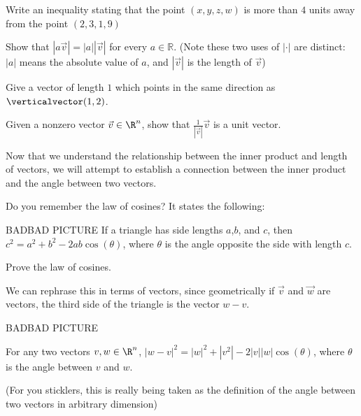 \begin{question}
	Write an inequality stating that the point $(x,y,z,w)$ is more than $4$ units away from the point $(2,3,1,9)$
\end{question}

\begin{question}
	Show that $|a\vec{v}| = |a| |\vec{v}|$ for every $a \in \mathbb{R}$. (Note these two uses of $|\cdot|$ are distinct:  $|a|$ means the absolute value of $a$, and $|\vec{v}|$ is the 
	length of $\vec{v}$)
\end{question}

\begin{question}
	Give a vector of length $1$ which points in the same direction as $\verticalvector(1,2)$.
\end{question}

\begin{question}
	Given a nonzero vector $\vec{v} \in \R^n$, show that $\frac{1}{|\vec{v}|}\vec{v}$ is a unit vector.
\end{question}

Now that we understand the relationship between the inner product and length of vectors, we will attempt to establish a connection between the inner product and the 
angle between two vectors.

Do you remember the law of cosines?  It states the following:

\begin{theorem}
	BADBAD PICTURE
	If a triangle has side lengths $a$,$b$, and $c$, then $c^2 = a^2+b^2 - 2ab\cos(\theta)$, where $\theta$ is the angle opposite the side with length $c$.
\end{theorem}

\begin{question}
Prove the law of cosines.
\end{question}

We can rephrase this in terms of vectors, since geometrically if $\vec{v}$ and $\vec{w}$ are vectors, the third side of the triangle is the vector $w-v$.

BADBAD PICTURE

\begin{theorem}
	For any two vectors $v,w \in \R^n$, $|w-v|^2 = |w|^2 +|v^2| - 2|v| |w| \cos(\theta) $, where $\theta$ is the angle between $v$ and $w$.
\end{theorem}

(For you sticklers, this is really being taken as the definition of the angle between two vectors in arbitrary dimension)

